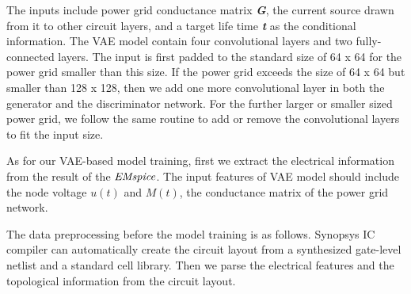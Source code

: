 The inputs include power grid conductance matrix \textit{\textbf{G}}, the current source drawn from it to other circuit layers, and a target life time \textit{\textbf{t}} as the conditional information. 
The VAE model contain four convolutional layers and two fully-connected layers. The input is first padded to the standard size of 64 x 64 for the power grid smaller than this size. If the power grid exceeds the size of 64 x 64 but smaller than 128 x 128, then we add one more convolutional layer in both the generator and the discriminator network. For the further larger or smaller sized power grid, we follow the same routine to add or remove the convolutional layers to fit the input size.

As for our VAE-based model training, first we extract the electrical information from the result of the  $\it{EMspice}$. The input features of VAE model should include the node voltage $u(t)$ and $M(t)$,  the conductance matrix of the power grid network.


The data preprocessing before the model training is as follows. Synopsys IC compiler can automatically create the circuit layout from a synthesized gate-level netlist and a standard cell library. 
Then we parse the electrical features and the topological information from the circuit layout.

\begin{table}[!htbp]
	\begin{center}
		\caption{Power Grid Design Detail}
		\label{table:pre_results}
		\center
	\end{center}
	\vspace{-0.1in}
\end{table}

